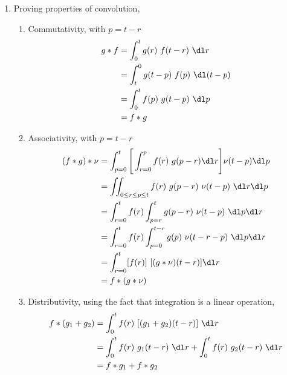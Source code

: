 \begin{enumerate}
    \item Proving properties of convolution,
          \begin{enumerate}
              \item Commutativity, with $ p = t-r $
                    \begin{align}
                        g * f & = \int_{0}^{t} g(r)\ f(t - r)\ \dl r       \\
                              & = \int_{t}^{0} g(t - p)\ f(p)\ \dl (t - p) \\
                              & = \int_{0}^{t} f(p)\ g(t-p)\ \dl p         \\
                              & = f * g
                    \end{align}
              \item Associativity, with $ p = t-r $
                    \begin{align}
                        (f * g) * \nu & = \int_{p=0}^{t}\Bigg[ \int_{r=0}^{p} f(r)
                        \ g(p-r) \dl r \Bigg] \nu(t-p) \dl p                       \\
                                      & = \iint_{0 \leq r \leq p \leq t}
                        f(r) \ g(p-r)\ \nu(t-p)\ \dl r \dl p                       \\
                                      & = \int_{r=0}^{t} f(r) \int_{p=r}^{t}
                        g(p - r)
                        \ \nu(t - p)\ \dl p \dl r                                  \\
                                      & = \int_{r=0}^{t} f(r) \int_{p=0}^{t-r}
                        g(p)
                        \ \nu(t - r - p)\ \dl p \dl r                              \\
                                      & = \int_{r=0}^{t} [f(r)]\ [(g * \nu)
                        (t - r)]
                        \dl r                                                      \\
                                      & = f * (g * \nu)
                    \end{align}

              \item Distributivity, using the fact that integration is a linear
                    operation,
                    \begin{align}
                        f * (g_1 + g_2) & = \int_{0}^{t} f(r)\ [(g_1 + g_2)
                        (t-r)]
                        \ \dl r                                                \\
                                        & = \int_{0}^{t} f(r)\ g_1(t-r)\ \dl r
                        + \int_{0}^{t} f(r)\ g_2(t-r)\ \dl r                   \\
                                        & = f * g_1 + f * g_2
                    \end{align}


\end{enumerate}
\end{enumerate}
